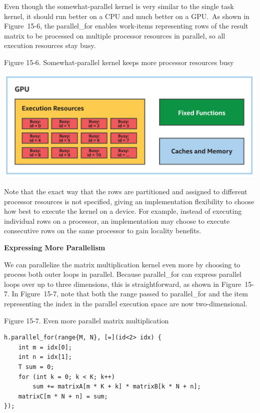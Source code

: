 Even though the somewhat-parallel kernel is very similar to the single task kernel, it should run better on a CPU and much better on a GPU. As shown in Figure 15-6, the parallel\_for enables work-items representing rows of the result matrix to be processed on multiple processor resources in parallel, so all execution resources stay busy.\par

\hspace*{\fill} \par %
Figure 15-6. Somewhat-parallel kernel keeps more processor resources busy
\begin{center}
	\includegraphics[width=1.0\textwidth]{content/chapter-15/images/5}
\end{center}

Note that the exact way that the rows are partitioned and assigned to different processor resources is not specified, giving an implementation flexibility to choose how best to execute the kernel on a device. For example, instead of executing individual rows on a processor, an implementation may choose to execute consecutive rows on the same processor to gain locality benefits.\par

\hspace*{\fill} \par %
\textbf{Expressing More Parallelism}

We can parallelize the matrix multiplication kernel even more by choosing to process both outer loops in parallel. Because parallel\_for can express parallel loops over up to three dimensions, this is straightforward, as shown in Figure 15-7. In Figure 15-7, note that both the range passed to parallel\_for and the item representing the index in the parallel execution space are now two-dimensional.\par

\hspace*{\fill} \par %
Figure 15-7. Even more parallel matrix multiplication
\begin{lstlisting}[caption={}]
h.parallel_for(range{M, N}, [=](id<2> idx) {
	int m = idx[0];
	int n = idx[1];
	T sum = 0;
	for (int k = 0; k < K; k++)
		sum += matrixA[m * K + k] * matrixB[k * N + n];
	matrixC[m * N + n] = sum;
});
\end{lstlisting}


